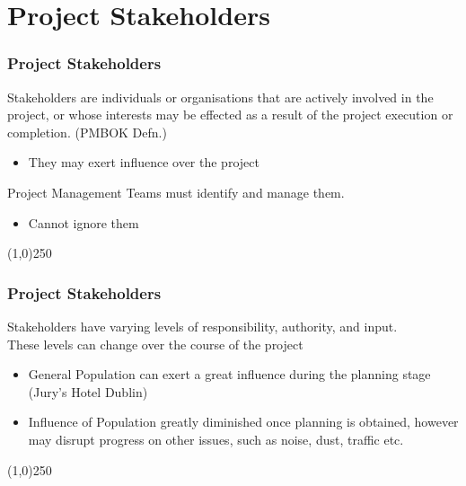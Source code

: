 \section{Project Stakeholders}


\begin{frame}
\frametitle{Project Stakeholders}
Stakeholders are individuals or organisations that are actively involved in the project, or whose interests may be effected as a result of the project execution or completion. (PMBOK Defn.)\\
\begin{itemize}
	\item They may exert influence over the project
\end{itemize}
Project Management Teams must identify and manage them.
\begin{itemize}
	\item Cannot ignore them 
\end{itemize}
\end{frame}
\begin{center}\line(1,0){250}\end{center}



\begin{frame}
\frametitle{Project Stakeholders}
Stakeholders have varying levels of responsibility, authority, and input.\\
These levels can change over the course of the project\\
\begin{itemize}
	\item General Population can exert a great influence during the planning stage (Jury's Hotel Dublin)
	\item Influence of Population greatly diminished once planning is obtained, however may disrupt progress on other issues, such as noise, dust, traffic etc.
\end{itemize}
\end{frame}
\begin{center}\line(1,0){250}\end{center}



